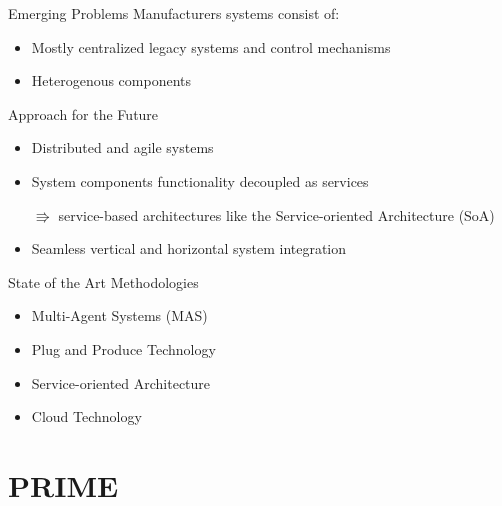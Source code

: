 \documentclass[12pt, xcolor=dvipsnames]{beamer}
\begin{document}
\begin{frame}{Emerging Problems}
	Manufacturers systems consist of:
	\begin{itemize}
		\item Mostly centralized legacy systems and control mechanisms
		\newline
		
		\item Heterogenous components
	\end{itemize}
\end{frame}

\begin{frame}{Approach for the Future}
	\begin{itemize}
		\item Distributed and agile systems
		\newline
		
		\item System components functionality decoupled as services
		\newline
		
		$\Rrightarrow$ service-based architectures like the Service-oriented Architecture (SoA)
		\newline
		
		\item Seamless vertical and horizontal system integration
	\end{itemize}
\end{frame}

\begin{frame}{State of the Art Methodologies}
	\begin{itemize}
		\item Multi-Agent Systems (MAS)
		\newline
		
		\item Plug and Produce Technology
		\newline
		
		\item Service-oriented Architecture
		\newline
		
		\item Cloud Technology
	\end{itemize}
\end{frame}

\section[PRIME] {PRIME}
\end{document}
